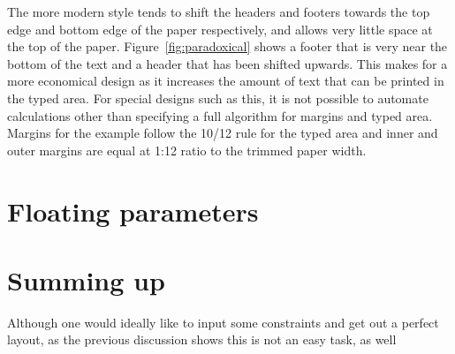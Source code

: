 The more modern style tends to shift the headers and footers towards the top edge and bottom edge of the paper respectively, and allows very little space at the top of the paper. Figure~\ref{fig:paradoxical} shows a footer that is very near the bottom of the text and a header that has been shifted upwards. This makes for a more economical design as it increases the amount of text that can be printed in the typed area. For special designs such as this, it is not possible to automate calculations other than specifying a full algorithm for margins and typed area. Margins for the example follow the 10/12 rule for the typed area and inner and outer margins are equal at 1:12 ratio to the trimmed paper width.
\section{Floating parameters}


\section{Summing up}

Although one would ideally like to input some constraints and get out a perfect layout, as the previous discussion shows this is not an easy task, as well 

%

\def\asidecaption{\parbox{4.2cm}{{\bfseries Image \thefigure}\par\lorem}%
}
\def\ps@caption{%
     \let\@oddfoot\@empty\let\@evenfoot\@empty%
    \def\@evenhead{%
        \begin{picture}(0,0)%
           \put(-150,-80){\asidecaption\par}%
            \stepcounter{figure}
           \put(-150,-370){\asidecaption}%
        \end{picture}%
      }%
    \let\@oddhead\@evenhead%
    \let\@mkboth\@gobbletwo%
    \let\chaptermark\@gobble%
    \let\sectionmark\@gobble%
 }

